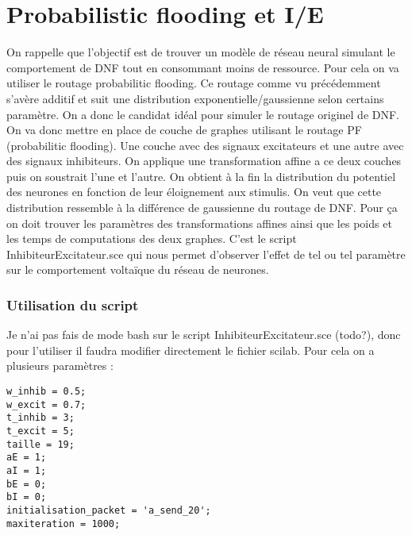 \documentclass{report}
\begin{document}
\part{Probabilistic flooding et I/E}

On rappelle que l'objectif est de trouver un modèle de réseau neural simulant le comportement de DNF tout en consommant moins de ressource. Pour cela on va utiliser le routage probabilitic flooding. Ce routage comme vu précédemment s'avère additif et suit une distribution exponentielle/gaussienne selon certains paramètre. On a donc le candidat idéal pour simuler le routage originel de DNF. On va donc mettre en place de couche de graphes utilisant le routage PF (probabilitic flooding). Une couche avec des signaux excitateurs et une autre avec des signaux inhibiteurs. On applique une transformation affine a ce deux couches puis on soustrait l'une et l'autre. On obtient à la fin la distribution du potentiel des neurones en fonction de leur éloignement aux stimulis. On veut que cette distribution ressemble à la différence de gaussienne du routage de DNF. Pour ça on doit trouver les paramètres des transformations affines ainsi que les poids et les temps de computations des deux graphes. C'est le script InhibiteurExcitateur.sce qui nous permet d'observer l'effet de tel ou tel paramètre sur le comportement voltaïque du réseau de neurones.

\section{Utilisation du script}

Je n'ai pas fais de mode bash sur le script InhibiteurExcitateur.sce (todo?), donc pour l'utiliser il faudra  modifier directement le fichier scilab. Pour cela on a plusieurs paramètres : 

\begin{verbatim}
w_inhib = 0.5; 
w_excit = 0.7;
t_inhib = 3;
t_excit = 5;
taille = 19;
aE = 1;
aI = 1;
bE = 0;
bI = 0;
initialisation_packet = 'a_send_20';
maxiteration = 1000;
\end{verbatim}
\end{document}
